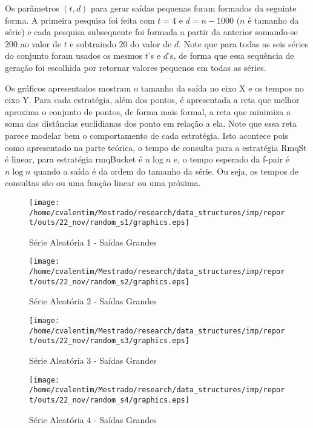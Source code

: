 \documentclass[12pt]{article}
\begin{document}
Os parâmetros $(t, d)$ para gerar saídas pequenas foram formados da seguinte forma. A primeira pesquisa
foi feita com $t = 4$ e $d = n - 1000$ ($n$ é tamanho da série) e cada pesquisa subsequente foi formada a partir da anterior somando-se
$200$ ao valor de $t$ e subtraindo $20$ do valor de $d$. Note que para todas as seis séries do conjunto foram usados os mesmos
$t$'s e $d$'s, de forma que essa sequência de geração foi escolhida por retornar valores pequenos em todas as séries.

Os gráficos apresentados mostram o tamanho da saída no eixo X e os tempos no eixo Y. Para cada estratégia,
além dos pontos, é apresentada a reta que melhor aproxima o conjunto de pontos, de forma mais formal, a reta
que minimiza a soma das distâncias euclidianas dos ponto em relação a ela. Note que essa reta parece modelar
bem o comportamento de cada estratégia. Isto acontece pois como apresentado na parte teórica, o tempo de consulta
para a estratégia RmqSt é linear, para estratégia rmqBucket é $n\log n$ e, o tempo esperado da f-pair é $n\log n$
quando a saída é da ordem do tamanho da série. Ou seja, os tempos de consultas são ou uma função linear ou uma próxima. 

\begin{figure}
\begin{center}
\texttt{[image: /home/cvalentim/Mestrado/research/data\_structures/imp/report/outs/22\_nov/random\_s1/graphics.eps]}
\caption{Série Aleatória 1 - Saídas Grandes}
\end{center}
\end{figure}

\begin{figure}
\begin{center}
\texttt{[image: /home/cvalentim/Mestrado/research/data\_structures/imp/report/outs/22\_nov/random\_s2/graphics.eps]}
\caption{Série Aleatória 2 - Saídas Grandes}
\end{center}
\end{figure}

\begin{figure}
\begin{center}
\texttt{[image: /home/cvalentim/Mestrado/research/data\_structures/imp/report/outs/22\_nov/random\_s3/graphics.eps]}
\caption{Série Aleatória 3 - Saídas Grandes}
\end{center}
\end{figure}

\begin{figure}
\begin{center}
\texttt{[image: /home/cvalentim/Mestrado/research/data\_structures/imp/report/outs/22\_nov/random\_s4/graphics.eps]}
\caption{Série Aleatória 4 - Saídas Grandes}
\end{center}
\end{figure}
\end{document}

